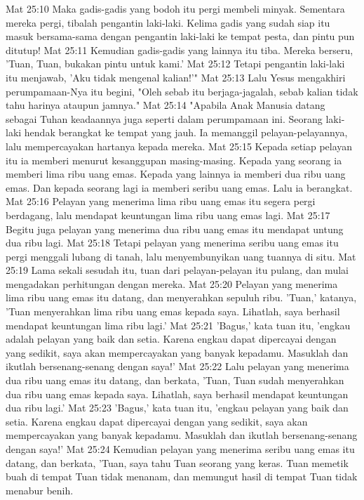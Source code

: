 Mat 25:10  Maka gadis-gadis yang bodoh itu pergi membeli minyak. Sementara mereka pergi, tibalah pengantin laki-laki. Kelima gadis yang sudah siap itu masuk bersama-sama dengan pengantin laki-laki ke tempat pesta, dan pintu pun ditutup!
Mat 25:11  Kemudian gadis-gadis yang lainnya itu tiba. Mereka berseru, 'Tuan, Tuan, bukakan pintu untuk kami.'
Mat 25:12  Tetapi pengantin laki-laki itu menjawab, 'Aku tidak mengenal kalian!'"
Mat 25:13  Lalu Yesus mengakhiri perumpamaan-Nya itu begini, "Oleh sebab itu berjaga-jagalah, sebab kalian tidak tahu harinya ataupun jamnya."
Mat 25:14  "Apabila Anak Manusia datang sebagai Tuhan keadaannya juga seperti dalam perumpamaan ini. Seorang laki-laki hendak berangkat ke tempat yang jauh. Ia memanggil pelayan-pelayannya, lalu mempercayakan hartanya kepada mereka.
Mat 25:15  Kepada setiap pelayan itu ia memberi menurut kesanggupan masing-masing. Kepada yang seorang ia memberi lima ribu uang emas. Kepada yang lainnya ia memberi dua ribu uang emas. Dan kepada seorang lagi ia memberi seribu uang emas. Lalu ia berangkat.
Mat 25:16  Pelayan yang menerima lima ribu uang emas itu segera pergi berdagang, lalu mendapat keuntungan lima ribu uang emas lagi.
Mat 25:17  Begitu juga pelayan yang menerima dua ribu uang emas itu mendapat untung dua ribu lagi.
Mat 25:18  Tetapi pelayan yang menerima seribu uang emas itu pergi menggali lubang di tanah, lalu menyembunyikan uang tuannya di situ.
Mat 25:19  Lama sekali sesudah itu, tuan dari pelayan-pelayan itu pulang, dan mulai mengadakan perhitungan dengan mereka.
Mat 25:20  Pelayan yang menerima lima ribu uang emas itu datang, dan menyerahkan sepuluh ribu. 'Tuan,' katanya, 'Tuan menyerahkan lima ribu uang emas kepada saya. Lihatlah, saya berhasil mendapat keuntungan lima ribu lagi.'
Mat 25:21  'Bagus,' kata tuan itu, 'engkau adalah pelayan yang baik dan setia. Karena engkau dapat dipercayai dengan yang sedikit, saya akan mempercayakan yang banyak kepadamu. Masuklah dan ikutlah bersenang-senang dengan saya!'
Mat 25:22  Lalu pelayan yang menerima dua ribu uang emas itu datang, dan berkata, 'Tuan, Tuan sudah menyerahkan dua ribu uang emas kepada saya. Lihatlah, saya berhasil mendapat keuntungan dua ribu lagi.'
Mat 25:23  'Bagus,' kata tuan itu, 'engkau pelayan yang baik dan setia. Karena engkau dapat dipercayai dengan yang sedikit, saya akan mempercayakan yang banyak kepadamu. Masuklah dan ikutlah bersenang-senang dengan saya!'
Mat 25:24  Kemudian pelayan yang menerima seribu uang emas itu datang, dan berkata, 'Tuan, saya tahu Tuan seorang yang keras. Tuan memetik buah di tempat Tuan tidak menanam, dan memungut hasil di tempat Tuan tidak menabur benih.
